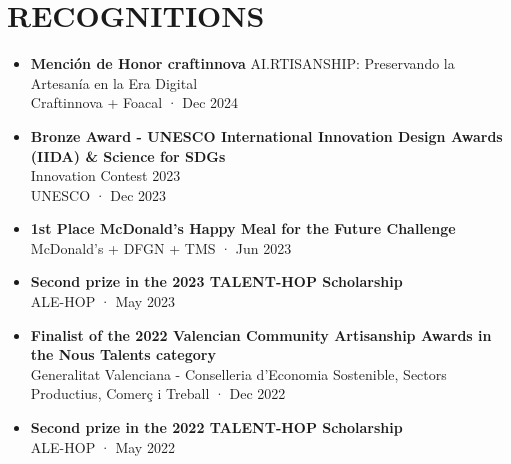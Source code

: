 \documentclass[11pt,a4paper]{article}
\begin{document}
\section*{RECOGNITIONS}
\begin{itemize}[leftmargin=*,label={},itemsep=2pt]
    \item \textbf{Mención de Honor craftinnova} AI.RTISANSHIP: Preservando la Artesanía en la Era Digital\\
    Craftinnova + Foacal · Dec 2024
    
    \item \textbf{Bronze Award - UNESCO International Innovation Design Awards (IIDA) \& Science for SDGs}\\
    Innovation Contest 2023\\
    UNESCO · Dec 2023
    
    \item \textbf{1st Place McDonald's Happy Meal for the Future Challenge}\\
    McDonald's + DFGN + TMS · Jun 2023
    
    \item \textbf{Second prize in the 2023 TALENT-HOP Scholarship}\\
    ALE-HOP · May 2023
    
    \item \textbf{Finalist of the 2022 Valencian Community Artisanship Awards in the Nous Talents category}\\
    Generalitat Valenciana - Conselleria d'Economia Sostenible, Sectors Productius, Comerç i Treball · Dec 2022

    \item \textbf{Second prize in the 2022 TALENT-HOP Scholarship}\\
    ALE-HOP · May 2022
\end{itemize}

\end{document}

